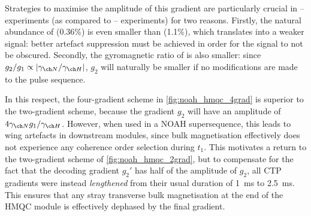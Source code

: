 Strategies to maximise the amplitude of this gradient are particularly crucial in \proton{}--\nitrogen{} experiments (as compared to \proton{}--\carbon{} experiments) for two reasons.
Firstly, the natural abundance of \nitrogen{} (0.36\%) is even smaller than \carbon{} (1.1\%), which translates into a weaker signal: better artefact suppression must be achieved in order for the signal to not be obscured.
Secondly, the gyromagnetic ratio of \nitrogen{} is also smaller: since $g_2/g_1 \propto |\gammaN/\gammaH|$, $g_2$ will naturally be smaller if no modifications are made to the pulse sequence.

In this respect, the four-gradient scheme in \cref{fig:noah_hmqc_4grad} is superior to the two-gradient scheme, because the gradient $g_2$ will have an amplitude of $4\gammaN g_1/\gammaH$.
However, when used in a NOAH supersequence, this leads to wing artefacts in downstream modules, since bulk  magnetisation effectively does not experience any coherence order selection during $t_1$.
This motivates a return to the two-gradient scheme of \cref{fig:noah_hmqc_2grad}, but to compensate for the fact that the decoding gradient $g_2'$ has half of the amplitude of $g_2$, all CTP gradients were instead \textit{lengthened} from their usual duration of \qty{1}{\ms} to \qty{2.5}{\ms}.
This ensures that any stray transverse bulk magnetisation at the end of the HMQC module is effectively dephased by the final gradient.


